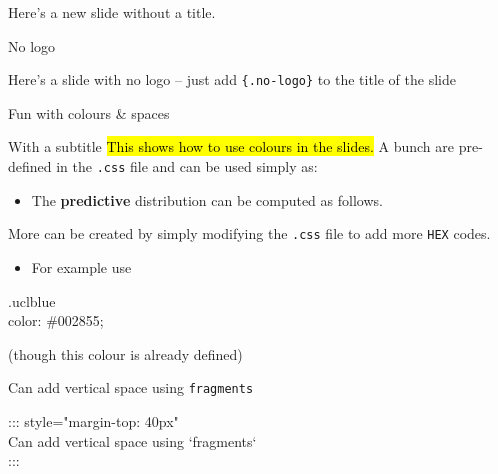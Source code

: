 \documentclass[
  10pt,
  ignorenonframetext,
  aspectratio=1610,
]{beamer}
\providecommand{\tightlist}{%
  \setlength{\itemsep}{0pt}\setlength{\parskip}{0pt}}
\newif\ifuclNoLogo
\newcommand{\magicmarker}[1]{\hl{#1}}
\begin{document}
\begin{frame}
Here's a new slide without a title.
\end{frame}

\begin{frame}[fragile]{No logo}
\protect{}\label{no-logo}
\global\uclNoLogotrue

Here's a slide with no logo -- just add \texttt{\{.no-logo\}} to the
title of the slide
\end{frame}

\begin{frame}[fragile]{Fun with colours \& spaces}
\protect{}\label{fun-with-colours-spaces}
\begin{block}{With a subtitle}
\protect{}\label{with-a-subtitle}
\magicmarker{This shows how to use colours in the slides.} A bunch are
pre-defined in the \texttt{.css} file and can be used simply as:

\begin{itemize}
\tightlist
\item
  The \textcolor{spanish-red}{\textbf{predictive}} distribution can be
  computed as follows.
\end{itemize}

More can be created by simply modifying the \texttt{.css} file to add
more \texttt{HEX} codes.

\begin{itemize}
\tightlist
\item
  For example use
\end{itemize}

\begin{tcolorbox}[colback=lightgray!40, colframe=navbargrey, arc=2pt, boxrule=0.5pt, fontupper=\ttfamily\footnotesize]
 .uclblue { \\    color: \#002855; \\ }
\end{tcolorbox}

(though this colour is already defined)

Can add vertical space using \texttt{fragments}

\begin{tcolorbox}[colback=lightgray!40, colframe=navbargrey, arc=2pt, boxrule=0.5pt, fontupper=\ttfamily\footnotesize]
::: {style="margin-top: 40px"} \\ Can add vertical space using `fragments` \\ :::   
\end{tcolorbox}
\end{block}
\end{frame}
\end{document}
